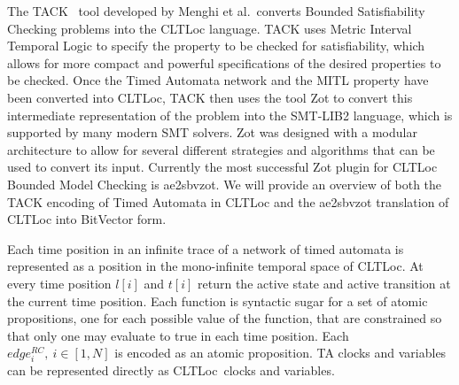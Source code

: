\documentclass[a4paper,11pt]{report}
\theoremstyle{definition}
\newcommand{\cltloc}{CLTLoc}
\newcommand{\aez}{ae2sbvzot}
\begin{document}
The TACK~\cite{tack20} tool developed by Menghi et al.\ converts Bounded
Satisfiability Checking problems into the CLTLoc language. TACK uses Metric
Interval Temporal Logic to specify the property to be checked for satisfiability,
which allows for more compact and powerful specifications of the desired
properties to be checked. Once the Timed Automata network and the MITL property
have been converted into CLTLoc, TACK then uses the tool Zot to convert this
intermediate representation of the problem into the SMT-LIB2 language, which is
supported by many modern SMT solvers. Zot was designed with a modular
architecture to allow for several different strategies and algorithms that can
be used to convert its input. Currently the most successful Zot plugin for
CLTLoc Bounded Model Checking is \aez. We will provide an overview of both
the TACK encoding of Timed Automata in CLTLoc and the ae2sbvzot translation of
CLTLoc into BitVector form.


Each time position in an infinite trace of a network of timed automata is
represented as a position in the mono-infinite temporal space of \cltloc. At
every time position $l[i]$ and $t[i]$ return the active state and active
transition at the current time position. Each function is syntactic sugar for a
set of atomic propositions, one for each possible value of the function, that
are constrained so that only one may evaluate to true in each time position.
Each $edge_{i}^{RC},\ i \in [1,N]$ is encoded as an atomic proposition. TA
clocks and variables can be represented directly as \cltloc\ clocks and
variables.
\end{document}
